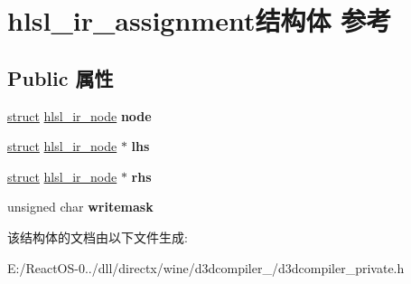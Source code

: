 \hypertarget{structhlsl__ir__assignment}{}\section{hlsl\+\_\+ir\+\_\+assignment结构体 参考}
\label{structhlsl__ir__assignment}
\subsection*{Public 属性}
\begin{DoxyCompactItemize}
\item 
\mbox{\label{structhlsl__ir__assignment_adcd17b5c01f48af95e6bc0bfc2a76e66}} 
\hyperlink{interfacestruct}{struct} \hyperlink{structhlsl__ir__node}{hlsl\+\_\+ir\+\_\+node} {\bfseries node}
\item 
\mbox{\label{structhlsl__ir__assignment_a56cfa669e907b0e42490c9045410814f}} 
\hyperlink{interfacestruct}{struct} \hyperlink{structhlsl__ir__node}{hlsl\+\_\+ir\+\_\+node} $\ast$ {\bfseries lhs}
\item 
\mbox{\label{structhlsl__ir__assignment_a1b8d822e7be8fa21e767807cc3a2ac61}} 
\hyperlink{interfacestruct}{struct} \hyperlink{structhlsl__ir__node}{hlsl\+\_\+ir\+\_\+node} $\ast$ {\bfseries rhs}
\item 
\mbox{\label{structhlsl__ir__assignment_a7e665b25cb3764da6f82e93248c72f1b}} 
unsigned char {\bfseries writemask}
\end{DoxyCompactItemize}


该结构体的文档由以下文件生成\+:\begin{DoxyCompactItemize}
\item 
E\+:/\+React\+O\+S-\/0../dll/directx/wine/d3dcompiler\+\_/d3dcompiler\+\_\+private.\+h\end{DoxyCompactItemize}
